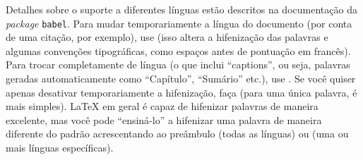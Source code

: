 Detalhes sobre o suporte a diferentes línguas estão descritos na
documentação da \textit{package} \texttt{babel}. Para mudar temporariamente
a língua do documento (por conta de uma citação, por exemplo), use
 (isso altera a hifenização
das palavras e algumas convenções tipográficas, como espaços antes de
pontuação em francês). Para trocar completamente de língua (o que
inclui ``captions'', ou seja, palavras geradas automaticamente como
``Capítulo'', ``Sumário'' etc.), use .
Se você quiser apenas desativar temporariamente a hifenização, faça
 (para uma única
palavra,  é mais simples). \LaTeX{} em
geral é capaz de hifenizar palavras de maneira excelente, mas você
pode ``ensiná-lo'' a hifenizar uma palavra de maneira diferente do
padrão acrescentando ao preâmbulo  (todas as línguas) ou  (uma ou mais línguas específicas).
